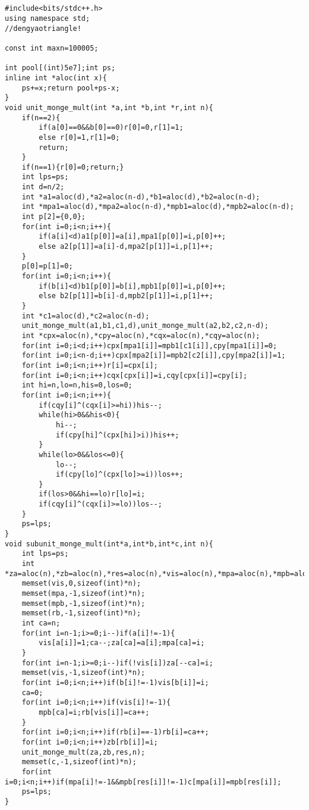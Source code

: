 \documentclass[12pt]{ctexart}
\begin{document}
\begin{lstlisting}


#include<bits/stdc++.h>
using namespace std;
//dengyaotriangle!

const int maxn=100005;

int pool[(int)5e7];int ps;
inline int *aloc(int x){
    ps+=x;return pool+ps-x;
}
void unit_monge_mult(int *a,int *b,int *r,int n){
    if(n==2){
        if(a[0]==0&&b[0]==0)r[0]=0,r[1]=1;
        else r[0]=1,r[1]=0;
        return;
    }
    if(n==1){r[0]=0;return;}
    int lps=ps;
    int d=n/2;
    int *a1=aloc(d),*a2=aloc(n-d),*b1=aloc(d),*b2=aloc(n-d);
    int *mpa1=aloc(d),*mpa2=aloc(n-d),*mpb1=aloc(d),*mpb2=aloc(n-d);
    int p[2]={0,0};
    for(int i=0;i<n;i++){
        if(a[i]<d)a1[p[0]]=a[i],mpa1[p[0]]=i,p[0]++;
        else a2[p[1]]=a[i]-d,mpa2[p[1]]=i,p[1]++;
    }
    p[0]=p[1]=0;
    for(int i=0;i<n;i++){
        if(b[i]<d)b1[p[0]]=b[i],mpb1[p[0]]=i,p[0]++;
        else b2[p[1]]=b[i]-d,mpb2[p[1]]=i,p[1]++;
    }
    int *c1=aloc(d),*c2=aloc(n-d);
    unit_monge_mult(a1,b1,c1,d),unit_monge_mult(a2,b2,c2,n-d);
    int *cpx=aloc(n),*cpy=aloc(n),*cqx=aloc(n),*cqy=aloc(n);
    for(int i=0;i<d;i++)cpx[mpa1[i]]=mpb1[c1[i]],cpy[mpa1[i]]=0;
    for(int i=0;i<n-d;i++)cpx[mpa2[i]]=mpb2[c2[i]],cpy[mpa2[i]]=1;
    for(int i=0;i<n;i++)r[i]=cpx[i];
    for(int i=0;i<n;i++)cqx[cpx[i]]=i,cqy[cpx[i]]=cpy[i];
    int hi=n,lo=n,his=0,los=0;
    for(int i=0;i<n;i++){
        if(cqy[i]^(cqx[i]>=hi))his--;
        while(hi>0&&his<0){
            hi--;
            if(cpy[hi]^(cpx[hi]>i))his++;
        }
        while(lo>0&&los<=0){
            lo--;
            if(cpy[lo]^(cpx[lo]>=i))los++;
        }
        if(los>0&&hi==lo)r[lo]=i;
        if(cqy[i]^(cqx[i]>=lo))los--;
    }
    ps=lps;
}
void subunit_monge_mult(int*a,int*b,int*c,int n){
    int lps=ps;
    int *za=aloc(n),*zb=aloc(n),*res=aloc(n),*vis=aloc(n),*mpa=aloc(n),*mpb=aloc(n),*rb=aloc(n);
    memset(vis,0,sizeof(int)*n);
    memset(mpa,-1,sizeof(int)*n);
    memset(mpb,-1,sizeof(int)*n);
    memset(rb,-1,sizeof(int)*n);
    int ca=n;
    for(int i=n-1;i>=0;i--)if(a[i]!=-1){
        vis[a[i]]=1;ca--;za[ca]=a[i];mpa[ca]=i;
    }
    for(int i=n-1;i>=0;i--)if(!vis[i])za[--ca]=i;
    memset(vis,-1,sizeof(int)*n);
    for(int i=0;i<n;i++)if(b[i]!=-1)vis[b[i]]=i;
    ca=0;
    for(int i=0;i<n;i++)if(vis[i]!=-1){
        mpb[ca]=i;rb[vis[i]]=ca++;
    }
    for(int i=0;i<n;i++)if(rb[i]==-1)rb[i]=ca++;
    for(int i=0;i<n;i++)zb[rb[i]]=i;
    unit_monge_mult(za,zb,res,n);
    memset(c,-1,sizeof(int)*n);
    for(int i=0;i<n;i++)if(mpa[i]!=-1&&mpb[res[i]]!=-1)c[mpa[i]]=mpb[res[i]];
    ps=lps;
}



\end{lstlisting}
\end{document}
